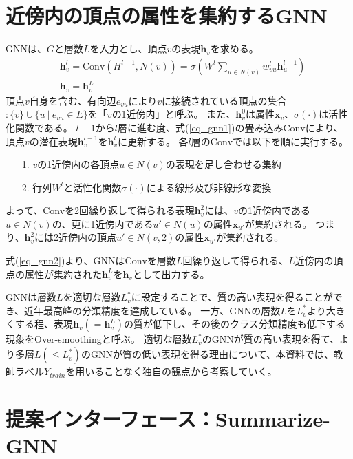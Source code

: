 \documentclass[a4j,twocolumn]{jsarticle}
\begin{document}
\section{近傍内の頂点の属性を集約するGNN}
\label{sec_gnn}

GNNは、$G$と層数$L$を入力とし、頂点$v$の表現$\bm{h}_v$を求める。
\begin{align}
  & \bm{h}_v^l = \text{Conv}(H^{l-1}, N(v)) = \sigma\left( W^l \sum_{u\in N(v)} w_{vu}^l\bm{h}_u^{l-1} \right) \label{eq_gnn1} \\
  & \bm{h}_v   = \bm{h}_v^L \label{eq_gnn2}
\end{align}
頂点$v$自身を含む、有向辺$e_{vu}$により$v$に接続されている頂点の集合$:\{v\} \cup \{u ~|~ e_{vu} \in E\}$を「$v$の1近傍内」と呼ぶ。
また、$\bm{h}_v^0$は属性$\bm{x}_v$、$\sigma(\cdot)$は活性化関数である。
$l-1$から$l$層に進む度、式(\ref{eq_gnn1})の畳み込み$\text{Conv}$により、頂点$v$の潜在表現$\bm{h}_v^{l-1}$を$\bm{h}_v^{l}$に更新する。
各$l$層の$\text{Conv}$では以下を順に実行する。\vspace{-1mm}
\begin{itemize}
  \item[1.] $v$の1近傍内の各頂点$u\in N(v)$の表現を足し合わせる集約\vspace{+1mm}
  \item[2.] 行列$W^l$と活性化関数$\sigma(\cdot)$による線形及び非線形な変換\vspace{-1mm}
\end{itemize}
よって、Convを2回繰り返して得られる表現$\bm{h}_v^2$には、$v$の1近傍内である$u\in N(v)$の、更に1近傍内である$u' \in N(u)$の属性$\bm{x}_{u'}$が集約される。
つまり、$\bm{h}_v^2$には2近傍内の頂点$u' \in N(v,2)$の属性$\bm{x}_{u'}$が集約される。

式(\ref{eq_gnn2})より、GNNは$\text{Conv}$を層数$L$回繰り返して得られる、$L$近傍内の頂点の属性が集約された$\bm{h}_v^L$を$\bm{h}_v$として出力する。

GNNは層数$L$を適切な層数$L_v^*$に設定することで、質の高い表現を得ることができ、近年最高峰の分類精度を達成している。
一方、GNNの層数$L$を$L_v^*$より大きくする程、表現$\bm{h}_v(=\bm{h}_v^L)$の質が低下し、その後のクラス分類精度も低下する現象をOver-smoothingと呼ぶ。
適切な層数$L_v^*$のGNNが質の高い表現を得て、より多層$L(\le L_v^*)$のGNNが質の低い表現を得る理由について、本資料では、教師ラベル$Y_{train}$を用いることなく独自の観点から考察していく。

\section{提案インターフェース：Summarize-GNN}
\label{sec_proposal}
\end{document}
